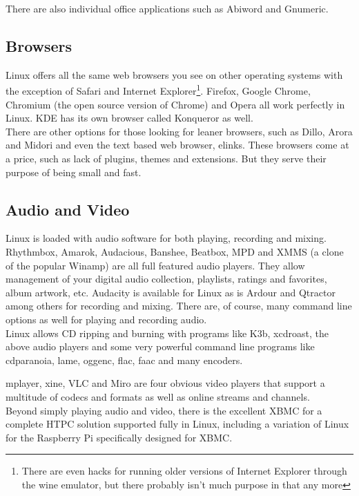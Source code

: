 There are also individual office applications such as Abiword and Gnumeric.\\

\subsection{Browsers}

Linux offers all the same web browsers you see on other operating systems with the exception of Safari and Internet Explorer\footnote{There are even hacks for running older versions of Internet Explorer through the wine emulator, but there probably isn't much purpose in that any more}.  Firefox, Google Chrome, Chromium (the open source version of Chrome) and Opera all work perfectly in Linux.  KDE has its own browser called Konqueror as well.\\

There are other options for those looking for leaner browsers, such as Dillo, Arora and Midori and even the text based web browser, elinks.  These browsers come at a price, such as lack of plugins, themes and extensions.  But they serve their purpose of being small and fast.

\subsection{Audio and Video}

Linux is loaded with audio software for both playing, recording and mixing.  Rhythmbox, Amarok, Audacious, Banshee, Beatbox, MPD and XMMS (a clone of the popular Winamp) are all full featured audio players.  They allow management of your digital audio collection, playlists, ratings and favorites, album artwork, etc.  Audacity is available for Linux as is Ardour and Qtractor among others for recording and mixing.  There are, of course, many command line options as well for playing and recording audio.\\

Linux allows CD ripping and burning with programs like K3b, xcdroast, the above audio players and some very powerful command line programs like cdparanoia, lame, oggenc, flac, faac and many encoders.

mplayer, xine, VLC and Miro are four obvious video players that support a multitude of codecs and formats as well as online streams and channels.\\

Beyond simply playing audio and video, there is the excellent XBMC for a complete HTPC solution supported fully in Linux, including a variation of Linux for the Raspberry Pi specifically designed for XBMC.\\

